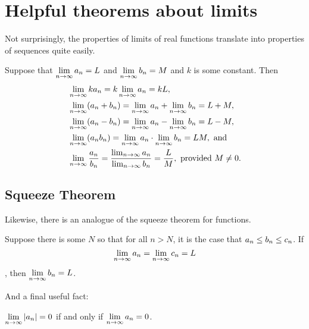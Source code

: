 \section{Helpful theorems about limits}
\label{section:theorems-about-limits}

Not surprisingly, the properties of limits of real functions translate
into properties of sequences quite easily. 

\begin{theorem} \relax\label{thm:properties-of-sequences}
Suppose that $\displaystyle\lim_{n\to\infty}a_n=L$ and 
$\displaystyle\lim_{n\to\infty}b_n=M$ and
$k$ is some constant. Then
\begin{align*}
&\lim_{n\to\infty} ka_n = k\lim_{n\to\infty}a_n=kL, \\
&\lim_{n\to\infty} (a_n+b_n) = \lim_{n\to\infty}a_n+\lim_{n\to\infty}b_n=L+M, \\
&\lim_{n\to\infty} (a_n-b_n) = \lim_{n\to\infty}a_n-\lim_{n\to\infty}b_n=L-M, \\
&\lim_{n\to\infty} (a_nb_n) = \lim_{n\to\infty}a_n\cdot\lim_{n\to\infty}b_n=LM, \mbox{ and}\\
&\lim_{n\to\infty} {a_n\over b_n} = {\lim_{n\to\infty}a_n\over
  \lim_{n\to\infty}b_n}={L\over M},\hbox{ provided $M \neq 0$.} \\
\end{align*}
\end{theorem}

\subsection{Squeeze Theorem}

Likewise, there is an analogue of the squeeze theorem for functions.

\begin{theorem}\relax\label{thm:squeeze theorem for sequences}
Suppose there is some $N$ so that for all $n > N$, it is the case that $\displaystyle a_n \le b_n \le c_n$. If $$\displaystyle\lim_{n\to\infty}a_n=\displaystyle\lim_{n\to\infty}c_n=L$$, 
then $\displaystyle\lim_{n\to\infty}b_n=L$.
\end{theorem}

And a final useful fact:

\begin{theorem} \relax\label{thm:absolute value sequence}
$\displaystyle\lim_{n\to\infty}|a_n|=0$ if and only if
$\displaystyle\lim_{n\to\infty}a_n=0$.
\end{theorem}

